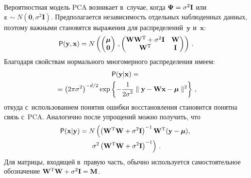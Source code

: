 \begin{multicols}{2}
     Вероятностная модель PCA возникает в~случае, когда 
${\boldsymbol{\Psi}}\hm= \sigma^2\mathbf{I}$ или 
${\boldsymbol{\varepsilon}}\sim N(\mathbf{0},\sigma^2\mathbf{I})$. 
Предполагается независимость отдельных наблюденных данных, поэтому 
важными становятся выражения для распределений~$\mathbf{y}$ 
и~$\mathbf{x}$:
     $$
     {\sf P}(\mathbf{y},\mathbf{x}) =N\left( \begin{pmatrix}
     {\boldsymbol{\mu}}\\ \mathbf{0}\end{pmatrix}\,, \begin{pmatrix}
     \mathbf{W}\mathbf{W}^{\mathrm{T}}+\sigma^2\mathbf{I}& \mathbf{W}\\
     \mathbf{W}^{\mathrm{T}} & \mathbf{I}
     \end{pmatrix} \right)\,.
     $$
Благодаря свойствам нормального многомерного распределения имеем:
\begin{multline*}
{\sf P}(\mathbf{y}\vert\mathbf{x}) ={}\\
{}=\left( 2\pi \sigma^2\right)^{-d/2}\exp \left\{ -
\displaystyle\frac{\displaystyle 1\mathstrut}{\displaystyle 2\sigma^2\mathstrut}\parallel \mathbf{y} -\mathbf{W x} -
{\boldsymbol{\mu}}\parallel^2\right\}\,,
\end{multline*}
откуда с~использованием понятия ошибки восстановления становится понятна 
связь с~PCA. Аналогично после упрощений можно получить, что
\begin{multline}
{\sf P}(\mathbf{x}\vert\mathbf{y})= N\left( \left( \mathbf{W}^{\mathrm{T}} 
\mathbf{W}+\sigma^2\mathbf{I}\right)^{-1} 
\mathbf{W}^{\mathrm{T}}(\mathbf{y}-{\boldsymbol{\mu}}),\right.\\ 
\left.\sigma^2\left(\mathbf{W}^{\mathrm{T}}\mathbf{W}+\sigma^2\mathbf{I}\right)^{-
1}\right)\,.
\label{e2-kri}
\end{multline}
Для матрицы, входящей в~правую часть, обычно используется самостоятельное 
обозначение 
$\mathbf{W}^{\mathrm{T}}\mathbf{W}\hm+\sigma^2\mathbf{I}\hm= 
\mathbf{M}$.
     

\end{multicols}
